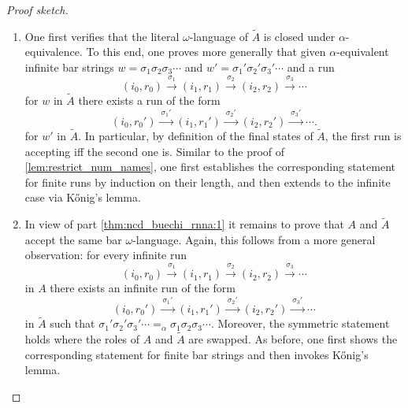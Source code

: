 \documentclass[10pt,a4paper]{amsart}
\numberwithin{equation}{section}
\newcommand{\xto}[1]{\xrightarrow{~#1~}}
\newcommand{\tl}{\widetilde}
\newcommand{\+}[1]{\mathcal{#1}\xspace}
\theoremstyle{definition}
\begin{document}
\begin{proof}[Proof sketch]
  \begin{enumerate}
  \item\label{thm:ncd_buechi_rnna:1} One first verifies that the
    literal $\omega$-language of $\tl{A}$ is closed under
    $\alpha$-equi\-va\-lence. To this end, one proves more generally
    that given $\alpha$-equivalent infinite bar strings
    $w=\sigma_1\sigma_2\sigma_3\cdots$ and
    $w'=\sigma_1'\sigma_2'\sigma_3'\cdots$ and a run
    \[
      (i_0,r_0)\xto{\sigma_1} (i_1,r_1)\xto{\sigma_2}
      (i_2,r_2)\xto{\sigma_3} \cdots
    \]
    for $w$ in $\tl{A}$ there exists a run of the form
    \[
      (i_0,r_0')\xto{\sigma_1'} (i_1,r_1')\xto{\sigma_2'}
      (i_2,r_2')\xto{\sigma_3'} \cdots.
    \]
    for $w'$ in $\tl{A}$. In particular, by definition of the final
    states of $\tl{A}$, the first run is accepting iff the second one
    is. Similar to the proof of \autoref{lem:restrict_num_names}, one
    first establishes the corresponding statement for finite runs by
    induction on their length, and then extends to the infinite case
    via K\H{o}nig's lemma.
  
  \item In view of part \ref{thm:ncd_buechi_rnna:1} it remains to prove
    that $A$ and $\tl{A}$ accept the same bar
    $\omega$-language. Again, this follows from a more general
    observation: for every infinite run
    \[
      (i_0,r_0)\xto{\sigma_1} (i_1,r_1)\xto{\sigma_2}
      (i_2,r_2)\xto{\sigma_3} \cdots
    \]
    in $A$ there exists an infinite run of the form 
    \[
      (i_0,r_0')\xto{\sigma_1'} (i_1,r_1')\xto{\sigma_2'}
      (i_2,r_2')\xto{\sigma_3'} \cdots
    \]
    in $\tl{A}$ such that
    $\sigma_1'\sigma_2'\sigma_3'\cdots =_\alpha
    \sigma_1\sigma_2\sigma_3\cdots$. Moreover, the symmetric statement
    holds where the roles of $A$ and $\tl{A}$ are swapped. As before,
    one first shows the corresponding statement for finite bar strings
    and then invokes K\H{o}nig's lemma.\qedhere
  \end{enumerate}
\end{proof}
%
%
\end{document}
